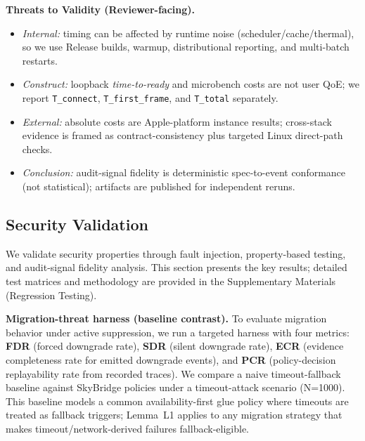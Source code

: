 \documentclass[10pt,journal,compsoc]{IEEEtran}
\providecommand{\tightlist}{%
  \setlength{\itemsep}{0pt}\setlength{\parskip}{0pt}}
\begin{document}
\textbf{Threats to Validity (Reviewer-facing).}
\begin{itemize}\tightlist
\item \emph{Internal:} timing can be affected by runtime noise (scheduler/cache/thermal), so we use Release builds, warmup, distributional reporting, and multi-batch restarts.
\item \emph{Construct:} loopback \emph{time-to-ready} and microbench costs are not user QoE; we report \texttt{T\_connect}, \texttt{T\_first\_frame}, and \texttt{T\_total} separately.
\item \emph{External:} absolute costs are Apple-platform instance results; cross-stack evidence is framed as contract-consistency plus targeted Linux direct-path checks.
\item \emph{Conclusion:} audit-signal fidelity is deterministic spec-to-event conformance (not statistical); artifacts are published for independent reruns.
\end{itemize}

\subsection{Security Validation}\label{b.-security-centric-evaluation}

We validate security properties through fault injection, property-based
testing, and audit-signal fidelity analysis. This section presents the
key results; detailed test matrices and methodology are provided in the
Supplementary Materials (Regression Testing).

\textbf{Migration-threat harness (baseline contrast).}
To evaluate migration behavior under active suppression, we run a
targeted harness with four metrics:
\textbf{FDR} (forced downgrade rate), \textbf{SDR} (silent downgrade
rate), \textbf{ECR} (evidence completeness rate for emitted downgrade
events), and \textbf{PCR} (policy-decision replayability rate from
recorded traces). We compare a naive timeout-fallback baseline against
SkyBridge policies under a timeout-attack scenario (N=1000).
This baseline models a common availability-first glue policy where timeouts are treated as fallback triggers; Lemma~L1 applies to any migration strategy that makes timeout/network-derived failures fallback-eligible.
\end{document}
